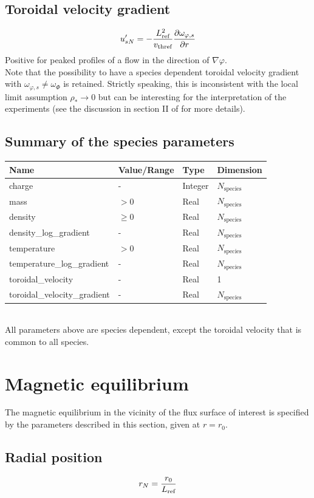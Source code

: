 \documentclass[fleqn]{report}
\begin{document}
\subsection{Toroidal velocity gradient}
$$u'_{sN}=-\frac{L_{\textrm{ref}}^2}{v_\textrm{thref}}\frac{\partial \omega_{\varphi,s}}{\partial r}$$
Positive for peaked profiles of a flow in the direction of $\nabla \varphi$.\\
Note that the possibility to have a species dependent toroidal velocity gradient with $\omega_{\varphi,s}\neq \omega_\Phi$ is retained. Strictly speaking, this is inconsistent with the local limit assumption $\rho_*\rightarrow 0$ but can be interesting for the interpretation of the experiments (see the discussion in section II of \cite{Camenen:PoP2016} for more details).


\subsection{Summary of the species parameters}
\begin{tabularx}{\textwidth}{|X|Y|Y|Y|}
\hline
Name & Value/Range & Type & Dimension \\
\hline
charge & - & Integer & $N_\textrm{species}$ \\
mass & $>0$ & Real & $N_\textrm{species}$ \\
density & $\geq0$ & Real & $N_\textrm{species}$  \\
density\_log\_gradient & - & Real & $N_\textrm{species}$\\
temperature & $>0$ & Real & $N_\textrm{species}$ \\
temperature\_log\_gradient & - & Real & $N_\textrm{species}$ \\
toroidal\_velocity & - & Real & 1 \\
toroidal\_velocity\_gradient & - & Real & $N_\textrm{species}$  \\
\hline
\end{tabularx}\\
All parameters above are species dependent, except the toroidal velocity that is common to all species. 

\section{Magnetic equilibrium}
The magnetic equilibrium in the vicinity of the flux surface of interest is specified by the parameters described in this section, given at $r=r_0$.

\subsection{Radial position}
$$r_N=\frac{r_0}{L_{\textrm{ref}}}$$
\end{document}
